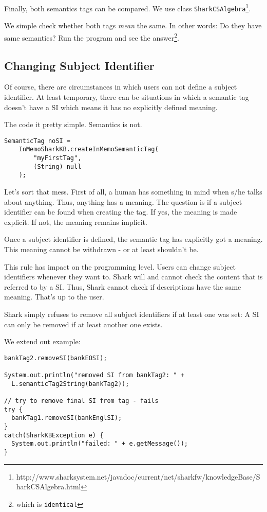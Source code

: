 Finally, both semantics tags can be compared. We use class
{\tt SharkCSAlgebra}\footnote{http://www.sharksystem.net/javadoc/current/net/sharkfw/knowledgeBase/SharkCSAlgebra.html}.

We simple check whether both tags {\it mean} the same. In other words:
Do they have same semantics? Run the program and see the answer\footnote{which is {\tt identical}}.

\subsection{Changing Subject Identifier}
Of course, there are circumstances in which users can not define a subject identifier. At least temporary, there can be situations in which a semantic tag doesn't have a SI which means it has no explicitly defined meaning.

The code it pretty simple. Semantics is not.

\begin{verbatim}
SemanticTag noSI =
    InMemoSharkKB.createInMemoSemanticTag(
        "myFirstTag",
        (String) null
    );
\end{verbatim}

Let's sort that mess. First of all, a human has something in mind when s/he talks about anything. Thus, anything has a meaning. The question is if a subject identifier can be found when creating the tag. If yes, the meaning is made explicit. If not, the meaning remains implicit.

Once a subject identifier is defined, the semantic tag has explicitly got a meaning. This meaning cannot be withdrawn - or at least shouldn't be.

This rule has impact on the programming level. Users can change subject identifiers whenever they want to. Shark will and cannot check the content that is referred to by a SI. Thus, Shark cannot check if descriptions have the same meaning. That's up to the user.

Shark simply refuses to remove all subject identifiers if at least one was set: A SI can only be removed if at least another one exists.

We extend out example:
\begin{verbatim}
bankTag2.removeSI(bankEOSI);

System.out.println("removed SI from bankTag2: " +
  L.semanticTag2String(bankTag2));

// try to remove final SI from tag - fails
try {
  bankTag1.removeSI(bankEnglSI);
}
catch(SharkKBException e) {
  System.out.println("failed: " + e.getMessage());
}
\end{verbatim}

